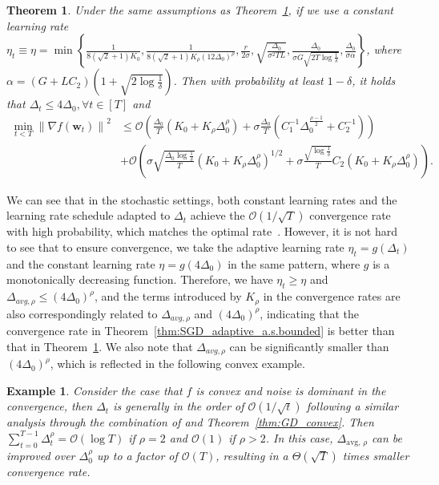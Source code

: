 \documentclass{article}
\newtheorem{example}{Example}
\newtheorem{theorem}{Theorem}
\newcommand{\Norm}[1]{\left\|#1\right\|}
\newcommand{\Kr}{K_{\rho}}
\newcommand{\paren}[1]{\left( #1 \right)}
\newcommand{\bw}{\mathbf{w}}
\newcommand{\cO}{\mathcal{O}}
\begin{document}
\begin{theorem}\label{thm:SGD_constant_a.s.bounded}
    Under the same assumptions as Theorem~\ref{thm:SGD_constant_a.s.bounded}, if we use a constant learning rate 
    $\eta_t \equiv \eta=\min \left\{\frac{1}{8(\sqrt{2}+1) K_0}, \frac{1}{8(\sqrt{2}+1) K_\rho\left(12 \Delta_0\right)^\rho}, \frac{r}{2 \sigma}, \sqrt{\frac{\Delta_0}{\sigma^2 T L}}, \frac{\Delta_0}{\sigma G \sqrt{2 T \log \frac{1}{\delta}}}, \frac{\Delta_0}{\sigma \alpha}\right\}$, 
    where $\alpha=\left(G+L C_2\right)\left(1+\sqrt{2 \log \frac{1}{\delta}}\right)$.
    Then with probability at least $1-\delta$, it holds that 
    $\Delta_t\leq 4\Delta_0,\forall t\in[T]$ and 
    \begin{align*}
        \min_{t<T}\Norm{\nabla f(\bw_t)}^2&\leq \mathcal{O}\left(\frac{\Delta_0}{T}\paren{K_0+\Kr\Delta_{0}^\rho}+\sigma\frac{\Delta_0}{T}\paren{C_1^{-1}\Delta_{0}^{\frac{\rho-1}{2}}+C_2^{-1}}\right)\\
        &+ \mathcal{O}\paren{\sigma\sqrt{\frac{\Delta_0\log\frac{1}{\delta}}{T}}\paren{K_0+\Kr\Delta_{0}^{\rho}}^{1/2}+\sigma\frac{\sqrt{\log\frac{1}{\delta}}}{T}C_2\paren{K_0+\Kr\Delta_0^\rho}}.
    \end{align*}
\end{theorem}


We can see that in the stochastic settings, both constant learning rates and the learning rate schedule adapted to $\Delta_t$ achieve the $\cO(1/\sqrt{T})$ convergence rate with high probability, which matches the optimal rate~\citep{arjevani2023lower}.
However, it is not hard to see that
to ensure convergence, we take the adaptive learning rate $\eta_t=g(\Delta_t)$ and the constant learning rate $\eta = g(4\Delta_0)$ in the same pattern, where $g$ is a monotonically decreasing function. Therefore, we have $\eta_t\geq\eta$ and $\Delta_{avg,\rho} \leq \paren{4\Delta_0}^\rho$, and the terms introduced by $K_\rho$ in the convergence rates are also correspondingly related to $\Delta_{avg,\rho}$ and $\paren{4\Delta_0}^\rho$, indicating that the convergence rate in Theorem~\ref{thm:SGD_adaptive_a.s.bounded} is better than that in Theorem~\ref{thm:SGD_constant_a.s.bounded}. 
We also note that $\Delta_{avg,\rho}$ can be significantly smaller than $\paren{4\Delta_0}^\rho$, which is reflected in the following convex example. 

\begin{example}
    Consider the case that $f$ is convex and noise is dominant in the convergence, then $\Delta_t$ is generally in the order of 
    $\mathcal{O}(1/\sqrt{t})$ following a similar analysis through the combination of \cite{liu2023revisiting} and Theorem~\ref{thm:GD_convex}. 
    Then $\sum_{t=0}^{T-1}\Delta_t^\rho =\mathcal{O}\paren{\log T} $ if $\rho=2$ and ${\mathcal{O}}\paren{1}$ if $\rho>2$. In this case, $\Delta_{\text {avg, } \rho}$ can be improved over $\Delta_0^\rho$ up to a factor of $\mathcal{O}(T)$, resulting in a $\Theta(\sqrt{T})$ times smaller convergence rate.
\end{example}
\end{document}
